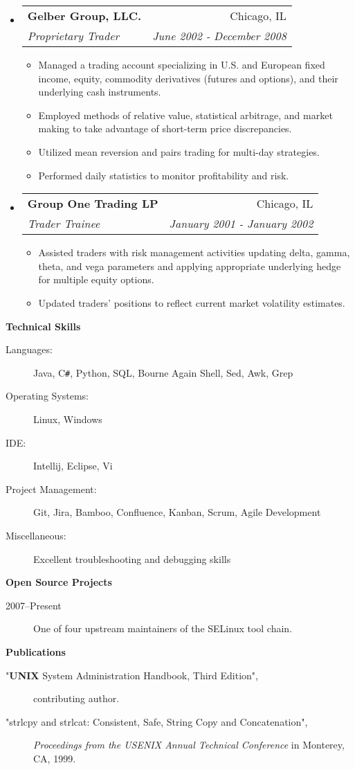 \documentclass[letterpaper,11pt]{article}
\makeatletter
\newcommand{\resitem}[1]{\item #1 \vspace{-2pt}}
\newcommand{\resheading}[1]{{\large \colorbox{mygrey}{\begin{minipage}{\textwidth}{\textbf{#1 \vphantom{p\^{E}}}}\end{minipage}}}}
\newcommand{\ressubheading}[4]{
\begin{tabular*}{7.0in}{l@{\extracolsep{\fill}}r}
		\textbf{#1} & #2 \\
		\textit{#3} & \textit{#4} \\
\end{tabular*}\vspace{-6pt}}
\makeatother
\begin{document}
\begin{itemize}
\item
	\ressubheading{Gelber Group, LLC.}{Chicago, IL}{Proprietary Trader}{June 2002 - December 2008}
	\begin{itemize}
		\resitem{Managed a trading account specializing in U.S. and European fixed income, equity, commodity
   derivatives (futures and options), and their underlying cash instruments.}
		\resitem{Employed methods of relative value, statistical arbitrage, and market making to take advantage 
   of short-term price discrepancies.}
		\resitem{Utilized mean reversion and pairs trading for multi-day strategies.}
		\resitem{Performed daily statistics to monitor profitability and risk. }
	\end{itemize}
	
\pagebreak

\item
	\ressubheading{Group One Trading LP}{Chicago, IL}{Trader Trainee}{January 2001 - January 2002}
	\begin{itemize}
		\resitem{Assisted traders with risk management activities updating delta, gamma, theta, and vega
  parameters and applying appropriate underlying hedge for multiple equity options.}
		\resitem{Updated traders’ positions to reflect current market volatility estimates.}
	\end{itemize}

\end{itemize}

\resheading{Technical Skills}

\begin{description}
\item[Languages:]
Java, C{}\verb!#!, Python, SQL, Bourne Again Shell, Sed, Awk, Grep
\item[Operating Systems:]
Linux, Windows
\item[IDE:]
Intellij, Eclipse, Vi
\item[Project Management:]
Git, Jira, Bamboo, Confluence, Kanban, Scrum, Agile Development
\item[Miscellaneous:]
Excellent troubleshooting and debugging skills
\end{description}

\resheading{Open Source Projects}

\begin{description}
\item[2007--Present] One of four upstream maintainers of the SELinux tool chain.
\end{description}

\resheading{Publications}

\begin{description}
\item["{\sc \bf UNIX} System Administration Handbook, Third Edition",]
contributing author.
\item["strlcpy and strlcat:  Consistent, Safe, String Copy and Concatenation",]
\emph{Proceedings from the USENIX Annual Technical Conference} in Monterey, CA, 1999.
\end{description}
\end{document}
